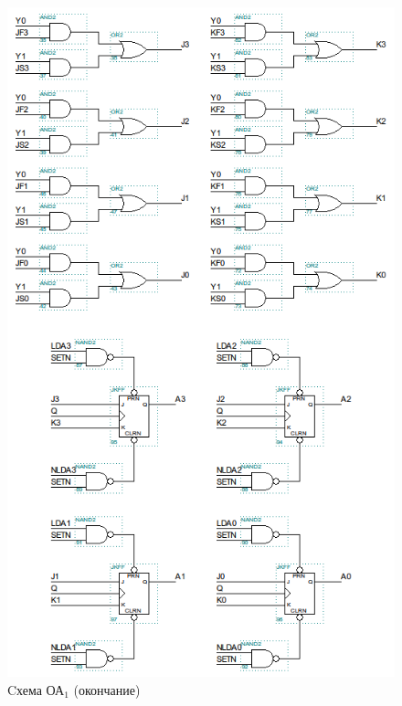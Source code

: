 \begin{figure}[H]
	\includegraphics[scale=0.6]{images/altera/rev2/oa1_2.png}
	\caption{Cхема ОА$_{1}$ (окончание)}
	\label{figure:oa1-2log}
\end{figure}


